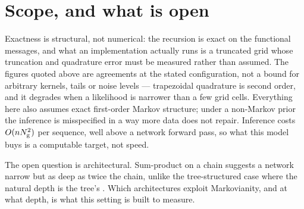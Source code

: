 \documentclass{article}
\begin{document}
\section{Scope, and what is open}

Exactness is structural, not numerical: the recursion is exact on the functional messages, and what
an implementation actually runs is a truncated grid whose truncation and quadrature error must be
measured rather than assumed. The figures quoted above are agreements at the stated configuration,
not a bound for arbitrary kernels, tails or noise levels --- trapezoidal quadrature is second order,
and it degrades when a likelihood is narrower than a few grid cells. Everything here also assumes
exact first-order Markov structure; under a non-Markov prior the inference is misspecified in a way
more data does not repair. Inference costs $O(nN_{\mathrm{g}}^{2})$ per sequence, well above a network
forward pass, so what this model buys is a computable target, not speed.

The open question is architectural. Sum-product on a chain suggests a network narrow but as deep
as twice the chain, unlike the tree-structured case where the natural depth is the tree's
\citep{mei2024unet,garnierbrun2024transformers}. Which architectures exploit Markovianity, and at
what depth, is what this setting is built to measure.

\label{LastMainPage}



\clearpage
\appendix

\end{document}
